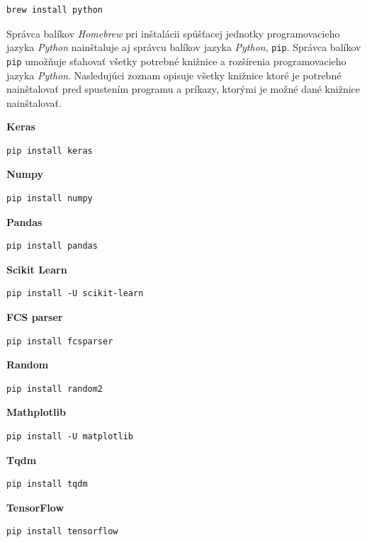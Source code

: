 \begin{Verbatim}[breaklines=true, breakanywhere=true]
brew install python
\end{Verbatim}

Správca balíkov \textit{Homebrew} pri inštalácii spúšťacej jednotky programovacieho jazyka \textit{Python} nainštaluje aj správcu balíkov jazyka \textit{Python}, \texttt{pip}. Správca balíkov \texttt{pip} umožňuje sťahovať všetky potrebné knižnice a rozšírenia programovacieho jazyka \textit{Python}. Nasledujúci zoznam opisuje všetky knižnice ktoré je potrebné nainštalovať pred spustením programu a príkazy, ktorými je možné dané knižnice nainštalovať.

\textbf{Keras}
\begin{Verbatim}[breaklines=true, breakanywhere=true]
pip install keras
\end{Verbatim}

\textbf{Numpy}
\begin{Verbatim}[breaklines=true, breakanywhere=true]
pip install numpy
\end{Verbatim}

\textbf{Pandas}
\begin{Verbatim}[breaklines=true, breakanywhere=true]
pip install pandas
\end{Verbatim}

\textbf{Scikit Learn}
\begin{Verbatim}[breaklines=true, breakanywhere=true]
pip install -U scikit-learn
\end{Verbatim}

\textbf{FCS parser}
\begin{Verbatim}[breaklines=true, breakanywhere=true]
pip install fcsparser
\end{Verbatim}

\textbf{Random}
\begin{Verbatim}[breaklines=true, breakanywhere=true]
pip install random2
\end{Verbatim}

\textbf{Mathplotlib}
\begin{Verbatim}[breaklines=true, breakanywhere=true]
pip install -U matplotlib
\end{Verbatim}

\textbf{Tqdm}
\begin{Verbatim}[breaklines=true, breakanywhere=true]
pip install tqdm
\end{Verbatim}

\textbf{TensorFlow}
\begin{Verbatim}[breaklines=true, breakanywhere=true]
pip install tensorflow
\end{Verbatim}

